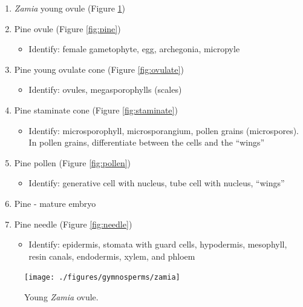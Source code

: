 \documentclass[]{book}
\providecommand{\tightlist}{%
  \setlength{\itemsep}{0pt}\setlength{\parskip}{0pt}}
\theoremstyle{definition}
\theoremstyle{definition}
\theoremstyle{definition}
\theoremstyle{remark}
\begin{document}
\begin{enumerate}
\def\labelenumi{\arabic{enumi}.}
\tightlist
\item
  \emph{Zamia} young ovule (Figure \ref{fig:zamia})
\item
  Pine ovule (Figure \ref{fig:pine})

  \begin{itemize}
  \tightlist
  \item
    Identify: female gametophyte, egg, archegonia, micropyle
  \end{itemize}
\item
  Pine young ovulate cone (Figure \ref{fig:ovulate})

  \begin{itemize}
  \tightlist
  \item
    Identify: ovules, megasporophylls (scales)
  \end{itemize}
\item
  Pine staminate cone (Figure \ref{fig:staminate})

  \begin{itemize}
  \tightlist
  \item
    Identify: microsporophyll, microsporangium, pollen grains
    (microspores). In pollen grains, differentiate between the cells and
    the ``wings''
  \end{itemize}
\item
  Pine pollen (Figure \ref{fig:pollen})

  \begin{itemize}
  \tightlist
  \item
    Identify: generative cell with nucleus, tube cell with nucleus,
    ``wings''
  \end{itemize}
\item
  Pine - mature embryo
\item
  Pine needle (Figure \ref{fig:needle})

  \begin{itemize}
  \tightlist
  \item
    Identify: epidermis, stomata with guard cells, hypodermis,
    mesophyll, resin canals, endodermis, xylem, and phloem
  \end{itemize}
\end{enumerate}

\begin{figure}

{\centering \texttt{[image: ./figures/gymnosperms/zamia]}

}

\caption{Young \emph{Zamia} ovule.}\label{fig:zamia}
\end{figure}
\end{document}
